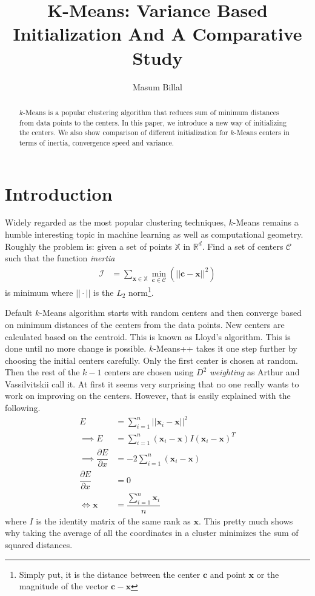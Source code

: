 \documentclass[10pt, leqno]{article}
\author{Masum Billal}
\title{K-Means: Variance Based Initialization And A Comparative Study}
\newcommand{\x}{\mathbf{x}}
\begin{document}
	\maketitle
		\begin{abstract}
			$k$-Means is a popular clustering algorithm that reduces sum of minimum distances from data points to the centers. In this paper, we introduce a new way of initializing the centers. We also show comparison of different initialization for $k$-Means centers in terms of inertia, convergence speed and variance.
		\end{abstract}
	\section{Introduction}
	Widely regarded as the most popular clustering techniques, $k$-Means remains a humble interesting topic in machine learning as well as computational geometry. Roughly the problem is: given a set of points $\mathbb{X}$ in $\mathbb{R}^d$. Find a set of centers $\mathcal{C}$ such that the function \textit{inertia}
		\begin{align*}
			\mathcal{I} & = \sum_{\mathbf{x}\in\mathbb{X}}\min_{\mathbf{c}\in\mathcal{C}}(||\mathbf{c}-\mathbf{x}||^2)
		\end{align*}
	is minimum where $||\cdot||$ is the $L_2$ norm\footnote{Simply put, it is the distance between the center $\mathbf{c}$ and point $\mathbf{x}$ or the magnitude of the vector $\mathbf{c}-\mathbf{x}$}.
	
	Default $k$-Means algorithm starts with random centers and then converge based on minimum distances of the centers from the data points. New centers are calculated based on the centroid. This is known as Lloyd's algorithm\cite{lloyd}. This is done until no more change is possible. $k$-Means++ takes it one step further by choosing the initial centers carefully. Only the first center is chosen at random. Then the rest of the $k-1$ centers are chosen using \textit{$D^2$ weighting} as Arthur and Vassilvitskii\cite{kmeans++} call it. At first it seems very surprising that no one really wants to work on improving on the centers. However, that is easily explained with the following.
		\begin{align*}
			E & = \sum_{i=1}^n||\x_i-\x||^2\\
			\implies E & = \sum_{i=1}^n(\x_i-\x)I(\x_i-\x)^{T}\\
			\implies \dfrac{\partial{E}}{\partial{x}} & = -2\sum_{i=1}^n(\x_i-\x)\\
			\dfrac{\partial{E}}{\partial{x}} & = 0\\
			\iff \x & = \dfrac{\sum_{i=1}^n\x_i}{n}
		\end{align*}
	where $I$ is the identity matrix of the same rank as $\x$. This pretty much shows why taking the average of all the coordinates in a cluster minimizes the sum of squared distances.
\end{document}
